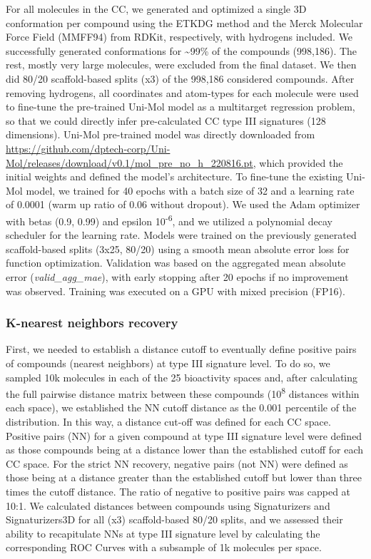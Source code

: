 For all molecules in the CC, we generated and optimized a single 3D conformation per compound using the ETKDG method\cite{riniker_better_2015} and the Merck Molecular Force Field (MMFF94) from RDKit, respectively, with hydrogens included. We successfully generated conformations for \textasciitilde99\% of the compounds (998,186). The rest, mostly very large molecules, were excluded from the final dataset. We then did 80/20 scaffold-based splits (x3) of the 998,186 considered compounds. After removing hydrogens, all coordinates and atom-types for each molecule were used to fine-tune the pre-trained Uni-Mol model as a multitarget regression problem, so that we could directly infer pre-calculated CC type III signatures (128 dimensions). Uni-Mol pre-trained model was directly downloaded from \href{https://github.com/dptech-corp/Uni-Mol/releases/download/v0.1/mol_pre_no_h_220816.pt}{https://github.com/dptech-corp/Uni-Mol/releases/download/v0.1/mol\_pre\_no\_h\_220816.pt}, which provided the initial weights and defined the model’s architecture. To fine-tune the existing Uni-Mol model, we trained for 40 epochs with a batch size of 32 and a learning rate of 0.0001 (warm up ratio of 0.06 without dropout). We used the Adam optimizer with betas (0.9, 0.99) and epsilon 10\textsuperscript{-6}, and we utilized a polynomial decay scheduler for the learning rate. Models were trained on the previously generated scaffold-based splits (3x25, 80/20) using a smooth mean absolute error loss for function optimization. Validation was based on the aggregated mean absolute error (\textit{valid\_agg\_mae}), with early stopping after 20 epochs if no improvement was observed. Training was executed on a GPU with mixed precision (FP16). 

\subsubsection{K-nearest neighbors recovery}

First, we needed to establish a distance cutoff to eventually define positive pairs of compounds (nearest neighbors) at type III signature level. To do so, we sampled 10k molecules in each of the 25 bioactivity spaces and, after calculating the full pairwise distance matrix between these compounds (10\textsuperscript{8} distances within each space), we established the NN cutoff distance as the 0.001 percentile of the distribution. In this way, a distance cut-off was defined for each CC space. Positive pairs (NN) for a given compound at type III signature level were defined as those compounds being at a distance lower than the established cutoff for each CC space. For the strict NN recovery, negative pairs (not NN) were defined as those being at a distance greater than the established cutoff but lower than three times the cutoff distance. The ratio of negative to positive pairs was capped at 10:1. We calculated distances between compounds using Signaturizers and Signaturizers3D for all (x3) scaffold-based 80/20 splits, and we assessed their ability to recapitulate NNs at type III signature level by calculating the corresponding ROC Curves with a subsample of 1k molecules per space. 

